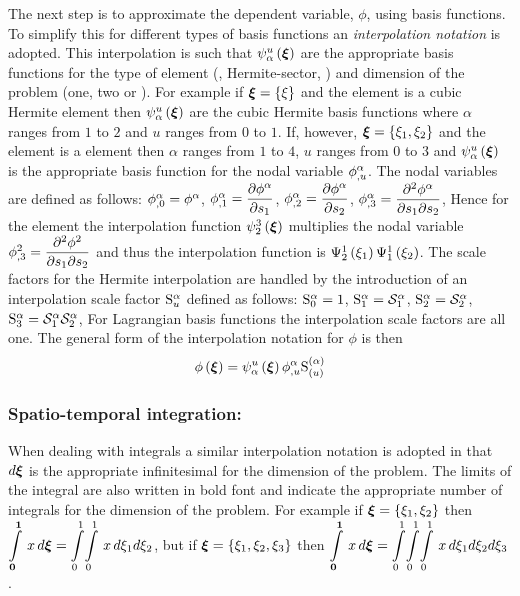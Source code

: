 The next step is to approximate the dependent variable, $\phi$, using basis
functions. To simplify this for different types of basis functions an
\emph{interpolation notation} is adopted. This
interpolation is such that $\gbfn{\alpha}{u}{\vect{\xi}}$ are the appropriate
basis functions for the type of element (\eg \bicubicherm, Hermite-sector,
\etc) and dimension of the problem (one, two or \threedal). For example if
$\vect{\xi}=\bbrac{\xi}$ and the element is a cubic Hermite element then
$\gbfn{\alpha}{u}{\vect{\xi}}$ are the cubic Hermite basis functions where
$\alpha$ ranges from $1$ to $2$ and $u$ ranges from $0$ to $1$. If, however,
$\vect{\xi}=\bbrac{\xione,\xitwo}$ and the element is a \bicubicherm element
then $\alpha$ ranges from $1$ to $4$, $u$ ranges from $0$ to $3$ and
$\gbfn{\alpha}{u}{\vect{\xi}}$ is the appropriate basis function for the nodal
variable $  {\phi}^{\alpha} _{,u} $. The nodal variables are defined as
follows: $  {\phi}^{\alpha} _{,0} = {\phi}^{\alpha} $,
$  {\phi}^{\alpha} _{,1} = \dfrac{\partial  {\phi}^{\alpha} }{\partial s_{1}} $,
$  {\phi}^{\alpha} _{,2} = \dfrac{\partial  {\phi}^{\alpha} }{\partial s_{2}} $,
$  {\phi}^{\alpha} _{,3} = \dfrac{\partial^{2}  {\phi}^{\alpha} }{\partial s_{1} \partial s_{2}} $,
\etc Hence for the \bicubicherm element the interpolation function
$\gbfn{2}{3}{\vect{\xi}}$ multiplies the nodal variable
$\phi^{2}_{,3}= \dfrac{\partial^{2} \phi^{2}}{\partial s_{1} \partial s_{2}} $ and thus the
interpolation function is $   \Psi_{2}^{1} \left( \xi_{1} \right)     \Psi_{1}^{1} \left( \xi_{2} \right)  $.  The
scale factors for the Hermite interpolation are handled by the introduction of
an interpolation scale factor $ \mathrm{S}^{\alpha}_{u} $ defined as follows:
$ \mathrm{S}^{\alpha}_{0} =1$, $ \mathrm{S}^{\alpha}_{1} = \mathcal{S}^{\alpha}_{1} $, $ \mathrm{S}^{\alpha}_{2} =
 \mathcal{S}^{\alpha}_{2} $, $ \mathrm{S}^{\alpha}_{3} = \mathcal{S}^{\alpha}_{1}  \mathcal{S}^{\alpha}_{2} $,
\etc For Lagrangian basis functions the interpolation scale factors are all
one. The general form of the interpolation notation for $\phi$ is then
\begin{equation}
  \fnof{\phi}{\vect{\xi}}=\gbfn{\alpha}{u}{\vect{\xi}}\nodedof{\phi}
  {\alpha}{u}\gsf{(\alpha)}{(u)}
  \label{eqn:phiinterpolation}
\end{equation}

\subsubsection{Spatio-temporal integration:}
When dealing with integrals a similar interpolation notation is adopted in
that $d\vect{\xi}$ is the appropriate infinitesimal for the dimension of the
problem. The limits of the integral are also written in bold font and indicate
the appropriate number of integrals for the dimension of the problem.  For
example if $\vect{\xi}=\bbrac{\xione,\xitwo}$ then
$\gint{\vect{0}}{\vect{1}}{x}
{\vect{\xi}}=\giint{0}{1}{0}{1}{x}{\xione}{\xitwo}$, but if $\vect{\xi}=
\bbrac{\xione,\xitwo,\xithree}$ then $\gint{\vect{0}}{\vect{1}}{x}
{\vect{\xi}}=\dintl{0}{1}\!\dintl{0}{1}\!\dintl{0}{1}\,x\,d\xione d\xitwo
d\xithree$.

